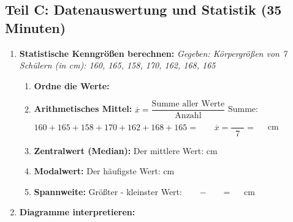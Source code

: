 \subsection*{Teil C: Datenauswertung und Statistik (35 Minuten)}

\begin{enumerate}[label=\arabic*.]

    \item \textbf{Statistische Kenngrößen berechnen:}
    \textit{Gegeben: Körpergrößen von 7 Schülern (in cm): 160, 165, 158, 170, 162, 168, 165}
    \vspace{0.5cm}

    \begin{enumerate}[label=\alph*)]
        \item \textbf{Ordne die Werte:} \underline{\hspace{8cm}}
        \vspace{0.5cm}

        \item \textbf{Arithmetisches Mittel:} $\overline{x} = \dfrac{\text{Summe aller Werte}}{\text{Anzahl}}$
        Summe: $160 + 165 + 158 + 170 + 162 + 168 + 165 = \phantom{000}$
        $\overline{x} = \dfrac{\phantom{000}}{7} = \phantom{00}$ cm
        \vspace{0.5cm}

        \item \textbf{Zentralwert (Median):} Der mittlere Wert: \underline{\hspace{2cm}} cm
        \vspace{0.5cm}

        \item \textbf{Modalwert:} Der häufigste Wert: \underline{\hspace{2cm}} cm
        \vspace{0.5cm}

        \item \textbf{Spannweite:} Größter - kleinster Wert: $\phantom{000} - \phantom{000} = \phantom{00}$ cm
    \end{enumerate}

    \vspace{1cm}

    \item \textbf{Diagramme interpretieren:}
    \vspace{0.5cm}


\end{enumerate}
